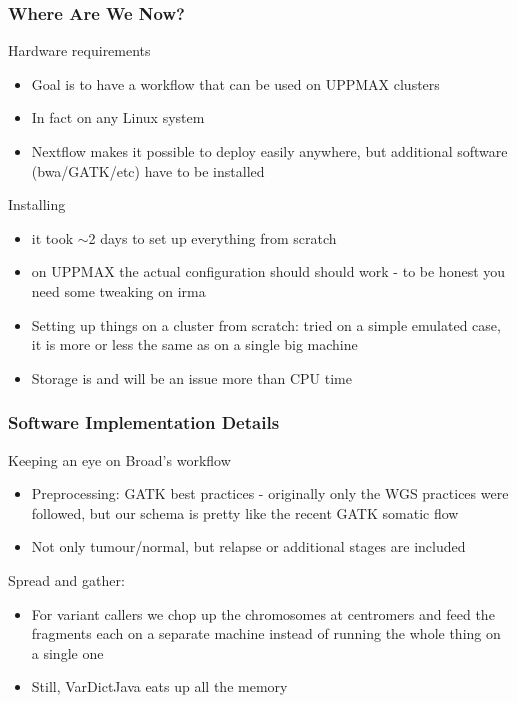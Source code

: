 \documentclass{beamer}
\begin{document}
\begin{frame}
\frametitle{Where Are We Now?}
\begin{block}{Hardware requirements}
	\begin{itemize}
		\item Goal is to have a workflow that can be used on UPPMAX clusters
		\item In fact on any Linux system
		\item Nextflow makes it possible to deploy easily anywhere, but additional software (bwa/GATK/etc) have to be installed
	\end{itemize}
\end{block}
\begin{block}{Installing}
	\begin{itemize}
		\item it took $\sim$2 days to set up everything from scratch
		\item on UPPMAX the actual configuration should should work - to be honest you need some tweaking on irma
		\item Setting up things on a cluster from scratch: tried on a simple emulated case, it is more or less the same as on a single big machine
		\item \alert{Storage is and will be an issue more than CPU time}
	\end{itemize}
\end{block}
\end{frame}

\begin{frame}
\frametitle{Software Implementation Details}
\begin{block}{Keeping an eye on Broad's workflow}
	\begin{itemize}
		\item Preprocessing: GATK best practices - originally only the WGS practices were followed, but our schema is pretty like the recent GATK somatic flow
		\item Not only tumour/normal, but relapse or additional stages are included
	\end{itemize}
\end{block}
\begin{block}{Spread and gather:}
	\begin{itemize}
		\item For variant callers we chop up the chromosomes at centromers and feed the fragments each on a separate machine instead of running the whole thing on a single one 
		\item Still, VarDictJava eats up all the memory
	\end{itemize}
\end{block}
\end{frame}
\end{document}
